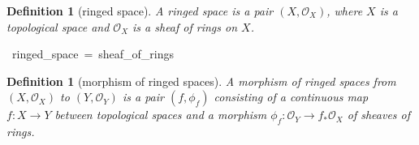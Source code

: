 \documentclass[12pt]{scrartcl}
\newtheorem{definition}[proposition]{Definition}
\begin{document}
\begin{definition}[ringed space]
	A ringed space is a pair $(X, \mathscr{O}_X)$, where $X$ is a topological space and $\mathscr{O}_X$ is a sheaf of rings on $X$.
\end{definition}


\begin{isabelle}
\ ringed\_space\ =\ sheaf\_of\_rings
\end{isabelle}

\begin{definition}[morphism of ringed spaces]
	A morphism of ringed spaces from $(X, \mathscr{O}_X)$ to $(Y, \mathscr{O}_Y)$ is a pair $(f, \phi_f)$ consisting of a continuous map $f: X \rightarrow Y$ between topological spaces and a morphism $\phi_f: \mathscr{O}_Y \rightarrow f_{*} \mathscr{O}_X$ of sheaves of rings.   
\end{definition}
\end{document}
